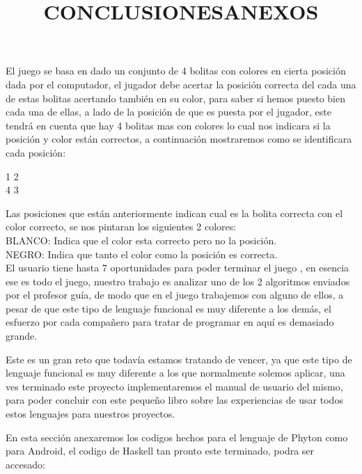 \documentclass[12pt]{extbook}
\begin{document}
El juego se basa en dado un conjunto de 4 bolitas con colores en cierta
posición dada por el computador, el jugador debe acertar la posición
correcta del cada una de estas bolitas acertando también en su color,
para saber si hemos puesto bien cada una de ellas, a lado de la posición
de que es puesta por el jugador, este tendrá en cuenta que hay 4 bolitas
mas con colores lo cual nos indicara si la posición y color están
correctos, a continuación mostraremos como se identificara cada posición:\\
\begin{center}
1          2\\

4          3\\	 
\end{center}
Las posiciones que están anteriormente indican cual es la bolita correcta
con el color correcto, se nos pintaran los siguientes 2 colores: \\

BLANCO: Indica que el color esta correcto pero no la posición. \\
	
NEGRO: Indica que tanto el color como la posición es correcta. \\

El usuario tiene hasta 7 oportunidades para poder terminar el juego
, en esencia ese es todo el juego, nuestro trabajo es analizar uno
de los 2 algoritmos enviados por el profesor guía, de modo que en
el juego trabajemos con alguno de ellos, a pesar de que este tipo
de lenguaje funcional es muy diferente a los demás, el esfuerzo por
cada compañero para tratar de programar en aquí es demasiado grande.

\begin{center}
\title{CONCLUSIONES}\maketitle
\end{center}

Este es un gran reto que todavía estamos tratando de vencer, ya que
este tipo de lenguaje funcional es muy diferente a los que normalmente
solemos aplicar, una ves terminado este proyecto implementaremos el
manual de usuario del mismo, para poder concluir con este pequeño
libro sobre las experiencias de usar todos estos lenguajes para nuestros
proyectos.
\newpage
\begin{center}
\title{ANEXOS}\maketitle
\end{center}
En esta sección anexaremos los codigos hechos para el lenguaje de Phyton
como para Android, el codigo de Haskell tan pronto este terminado, podra ser
accesado:\\
\end{document}
